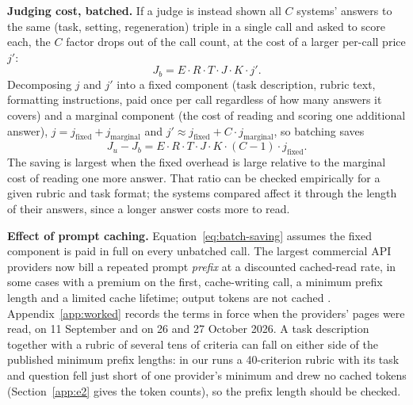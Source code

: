 \documentclass[11pt]{article}
\begin{document}
\textbf{Judging cost, batched.} If a judge is instead shown all $C$ systems' answers to
the same (task, setting, regeneration) triple in a single call and asked to score each,
the $C$ factor drops out of the call count, at the cost of a larger per-call price $j'$:
\begin{equation}
J_b = E \cdot R \cdot T \cdot J \cdot K \cdot j'.
\label{eq:judging-batched}
\end{equation}
Decomposing $j$ and $j'$ into a fixed component (task description, rubric text,
formatting instructions, paid once per call regardless of how many answers it covers)
and a marginal component (the cost of reading and scoring one additional answer),
$j = j_{\text{fixed}} + j_{\text{marginal}}$ and $j' \approx j_{\text{fixed}} + C \cdot
j_{\text{marginal}}$, so batching saves
\begin{equation}
J_u - J_b = E \cdot R \cdot T \cdot J \cdot K \cdot (C - 1) \cdot j_{\text{fixed}}.
\label{eq:batch-saving}
\end{equation}
The saving is largest when the fixed overhead is large relative to the marginal cost of reading one more answer. That ratio can be checked empirically for a given rubric and task format; the systems compared affect it through the length of their answers, since a longer answer costs more to read.

\textbf{Effect of prompt caching.} Equation~\ref{eq:batch-saving} assumes
the fixed component is paid in full on every unbatched call. The largest commercial API
providers now bill a repeated prompt \emph{prefix} at a discounted cached-read rate, in
some cases with a premium on the first, cache-writing call, a minimum prefix length and a
limited cache lifetime; output tokens are not cached \citep{openai2026caching,
anthropic2026caching, google2026pricing}. Appendix~\ref{app:worked} records the terms in
force when the providers' pages were read, on 11 September and on 26 and 27 October 2026. A task description together with a rubric of several tens
of criteria can fall on either side of the published minimum prefix lengths: in our runs a 40-criterion rubric with its task and question fell just short of one provider's minimum and drew no cached tokens (Section~\ref{app:e2} gives the token counts), so the prefix length should be checked.
\end{document}
